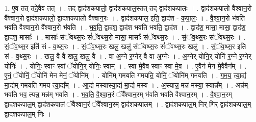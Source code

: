 \documentclass[17pt]{extarticle}
\begin{document}
1. ए॒व तत् तदे॒वैव तत् । . तद् द्वाद॑शकपालो॒ द्वाद॑शकपाल॒स्तत् तद् द्वाद॑शकपालः । . द्वाद॑शकपालो वैश्वान॒रो वै᳚श्वान॒रो द्वाद॑शकपालो॒ द्वाद॑शकपालो वैश्वान॒रः । . द्वाद॑शकपाल॒ इति॒ द्वाद॑श - क॒पा॒लः॒ । . वै॒श्वा॒न॒रो भ॑वति भवति वैश्वान॒रो वै᳚श्वान॒रो भ॑वति । . भ॒व॒ति॒ द्वाद॑श॒ द्वाद॑श भवति भवति॒ द्वाद॑श । . द्वाद॑श॒ मासा॒ मासा॒ द्वाद॑श॒ द्वाद॑श॒ मासाः᳚ । . मासाः᳚ संॅवथ्स॒रः सं॑ॅवथ्स॒रो मासा॒ मासाः᳚ संॅवथ्स॒रः । . सं॒ॅव॒थ्स॒रः सं॑ॅवथ्स॒रः । . सं॒ॅव॒थ्स॒र इति॑ सं - व॒थ्स॒रः । . सं॒ॅव॒थ्स॒रः खलु॒ खलु॑ संॅवथ्स॒रः सं॑ॅवथ्स॒रः खलु॑ । . सं॒ॅव॒थ्स॒र इति॑ सं - व॒थ्स॒रः । . खलु॒ वै वै खलु॒ खलु॒ वै । . वा अ॒ग्ने र॒ग्नेर् वै वा अ॒ग्नेः । . अ॒ग्नेर् योनि॒र् योनि॑ र॒ग्ने र॒ग्नेर् योनिः॑ । . योनिः॒ स्वाꣳ स्वां ॅयोनि॒र् योनिः॒ स्वाम् । . स्वा मे॒वैव स्वाꣳ स्वा मे॒व । . ए॒वैन॑ मेन मे॒वैवैन᳚म् । . ए॒नं॒ ॅयोनिं॒ ॅयोनि॑ मेन मेनं॒ ॅयोनि᳚म् । . योनि॑म् गमयति गमयति॒ योनिं॒ ॅयोनि॑म् गमयति । . ग॒म॒य॒ त्या॒द्य॑ मा॒द्य॑म् गमयति गमय त्या॒द्य᳚म् । . आ॒द्य॑ मस्यास्या॒द्य॑ मा॒द्य॑ मस्य । . अ॒स्यान्न॒ मन्न॑ मस्या॒ स्यान्न᳚म् । . अन्न॑म् भवति भव॒ त्यन्न॒ मन्न॑म् भवति । . भ॒व॒ति॒ वै॒श्वा॒न॒रं ॅवै᳚श्वान॒रम् भ॑वति भवति वैश्वान॒रम् । . वै॒श्वा॒न॒रम् द्वाद॑शकपाल॒म् द्वाद॑शकपालं ॅवैश्वान॒रं ॅवै᳚श्वान॒रम् द्वाद॑शकपालम् । . द्वाद॑शकपाल॒म् निर् णिर् द्वाद॑शकपाल॒म् द्वाद॑शकपाल॒म् निः । \newline
\end{document}
